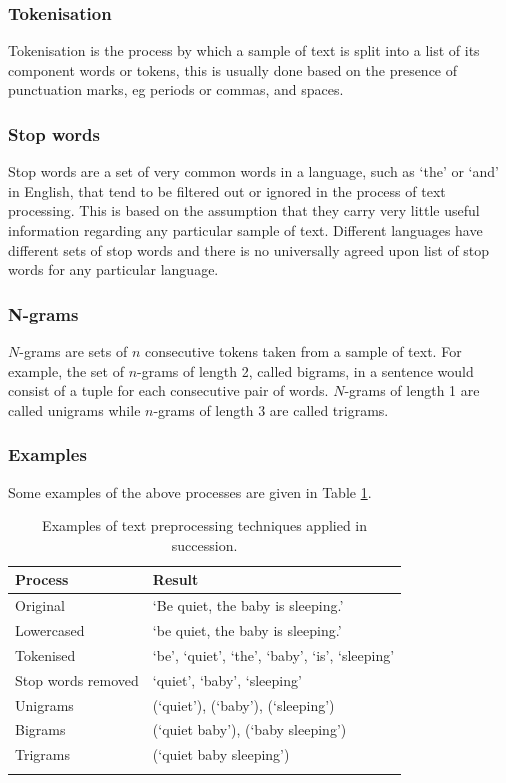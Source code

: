 \subsubsection{Tokenisation}

Tokenisation is the process by which a sample of text is split into a list of its component words or tokens, this is usually done based on the presence of punctuation marks, eg periods or commas, and spaces.

\subsubsection{Stop words}

Stop words are a set of very common words in a language, such as `the' or `and' in English, that tend to be filtered out or ignored in the process of text processing. This is based on the assumption that they carry very little useful information regarding any particular sample of text. Different languages have different sets of stop words and there is no universally agreed upon list of stop words for any particular language.

\subsubsection{N-grams}

$N$-grams are sets of $n$ consecutive tokens taken from a sample of text. For example, the set of $n$-grams of length 2, called bigrams, in a sentence would consist of a tuple for each consecutive pair of words. $N$-grams of length 1 are called unigrams while $n$-grams of length 3 are called trigrams.

\subsubsection{Examples}

Some examples of the above processes are given in Table \ref{tab:Explain_TextProc}.

\begin{table}[ht]
    \centering
    \begin{tabular}{l l}
        \toprule
        \textbf{Process} & \textbf{Result} \\\midrule
        Original & `Be quiet, the baby is sleeping.'\\
        Lowercased & `be quiet, the baby is sleeping.'\\
        Tokenised & `be', `quiet', `the', `baby', `is', `sleeping'\\
        Stop words removed & `quiet', `baby', `sleeping'\\
        Unigrams & (`quiet'), (`baby'), (`sleeping')\\
        Bigrams & (`quiet baby'), (`baby sleeping')\\
        Trigrams & (`quiet baby sleeping')\\
        \bottomrule\\
    \end{tabular}
    \caption{Examples of text preprocessing techniques applied in succession.}
    \label{tab:Explain_TextProc}
\end{table}

